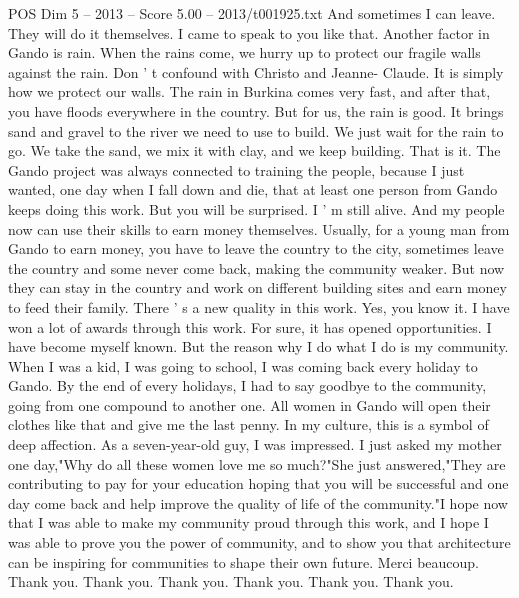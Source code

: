 \begin{textsample}{POS Dim 5 – 2013 – Score 5.00 – 2013/t001925.txt}
And sometimes I can leave.
They will do it themselves.
I came to speak to you like that.
Another factor in Gando is rain.
When the rains come, we hurry up to protect our fragile walls against the rain.
Don ' t confound with Christo and Jeanne- Claude.
It is simply how we protect our walls.
The rain in Burkina comes very fast, and after that, you have floods everywhere in the country.
But for us, the rain is good.
It brings sand and gravel to the river we need to use to build.
We just wait for the rain to go.
We take the sand, we mix it with clay, and we keep building.
That is it.
The Gando project was always connected to training the people, because I just wanted, one day when I fall down and die, that at least one person from Gando keeps doing this work.
But you will be surprised.
I ' m still alive.
And my people now can use their skills to earn money themselves.
Usually, for a young man from Gando to earn money, you have to leave the country to the city, sometimes leave the country and some never come back, making the community weaker.
But now they can stay in the country and work on different building sites and earn money to feed their family.
There ' s a new quality in this work.
Yes, you know it.
I have won a lot of awards through this work.
For sure, it has opened opportunities.
I have become myself known.
But the reason why I do what I do is my community.
When I was a kid, I was going to school, I was coming back every holiday to Gando.
By the end of every holidays, I had to say goodbye to the community, going from one compound to another one.
All women in Gando will open their clothes like that and give me the last penny.
In my culture, this is a symbol of deep affection.
As a seven-year-old guy, I was impressed.
I just asked my mother one day,"Why do all these women love me so much?"She just answered,"They are contributing to pay for your education hoping that you will be successful and one day come back and help improve the quality of life of the community."I hope now that I was able to make my community proud through this work, and I hope I was able to prove you the power of community, and to show you that architecture can be inspiring for communities to shape their own future.
Merci beaucoup.
Thank you.
Thank you.
Thank you.
Thank you.
Thank you.
Thank you.

\end{textsample}
